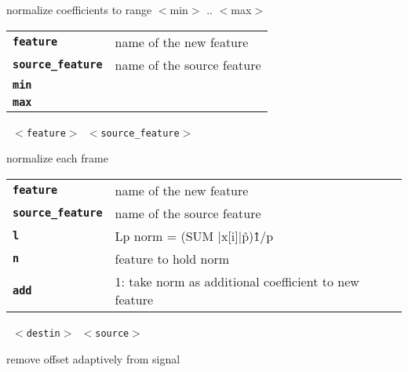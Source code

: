 \begin{description}
\begin{description}
        normalize coefficients to range $<$min$>$ .. $<$max$>$

      \begin{tabular}{ll}
 \texttt{\textbf{feature}} &         name of the new feature \\
 \texttt{\textbf{source\_feature}} &  name of the source feature \\
 \texttt{\textbf{min}} &                \\
 \texttt{\textbf{max}} &                \\
      \end{tabular}
       \texttt{ $<$feature$>$ $<$source\_feature$>$   } \

        normalize each frame

      \begin{tabular}{ll}
 \texttt{\textbf{feature}} &         name of the new feature \\
 \texttt{\textbf{source\_feature}} &  name of the source feature \\
 \texttt{\textbf{l}} &                Lp norm = (SUM |x[i]|\^p)\^1/p  \\
 \texttt{\textbf{n}} &                feature to hold norm \\
 \texttt{\textbf{add}} &              1: take norm as additional coefficient to new feature  \\
      \end{tabular}
       \texttt{ $<$destin$>$ $<$source$>$          } \

        remove offset adaptively from signal


\end{description}
\end{description}
